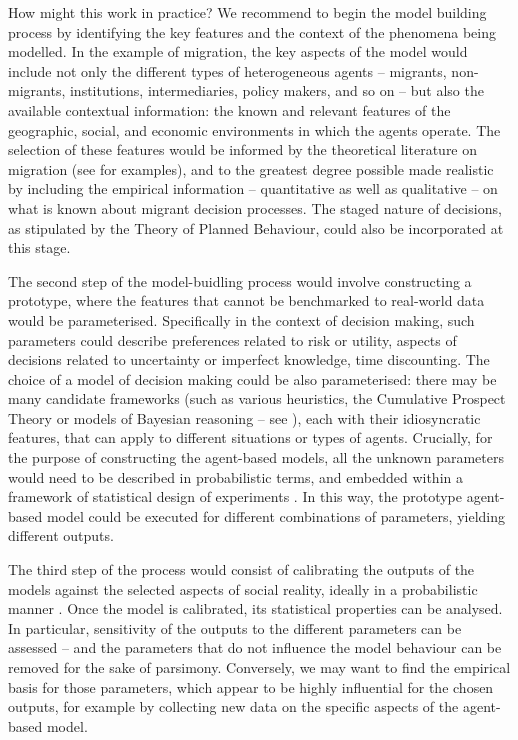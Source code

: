 \documentclass{article}
\begin{document}
How might this work in practice? We recommend to begin the model building process by identifying the key features and the context of the phenomena being modelled. In the example of migration, the key aspects of the model would include not only the different types of heterogeneous agents -- migrants, non-migrants, institutions, intermediaries, policy makers, and so on -- but also the available contextual information: the known and relevant features of the geographic, social, and economic environments in which the agents operate. The selection of these features would be informed by the theoretical literature on migration (see \citeauthor{Massey1993} \citeyear{Massey1993} for examples), and to the greatest degree possible made realistic by including the empirical information -- quantitative as well as qualitative -- on what is known about migrant decision processes. The staged nature of decisions, as stipulated by the Theory of Planned Behaviour, could also be incorporated at this stage.

The second step of the model-buidling process would involve constructing a prototype, where the features that cannot be benchmarked to real-world data would be parameterised. Specifically in the context of decision making, such parameters could describe preferences related to risk or utility, aspects of decisions related to uncertainty or imperfect knowledge, time discounting. The choice of a model of decision making could be also parameterised: there may be many candidate frameworks (such as various heuristics, the Cumulative Prospect Theory or models of Bayesian reasoning -- see \citeauthor{Gray2016} \citeyear{Gray2016}), each with their idiosyncratic features, that can apply to different situations or types of agents. Crucially, for the purpose of constructing the agent-based models, all the unknown parameters would need to be described in probabilistic terms, and embedded within a framework of statistical design of experiments \citet{Chaloner}. In this way, the prototype agent-based model could be executed for different combinations of parameters, yielding different outputs.

The third step of the process would consist of calibrating the outputs of the models against the selected aspects of social reality, ideally in a probabilistic manner \citep{Hilton2016}. Once the model is calibrated, its statistical properties can be analysed. In particular, sensitivity of the outputs to the different parameters can be assessed \citep{Oakley2004} -- and the parameters that do not influence the model behaviour can be removed for the sake of parsimony. Conversely, we may want to find the empirical basis for those parameters, which appear to be highly influential for the chosen outputs, for example by collecting new data on the specific aspects of the agent-based model. 
\end{document}
